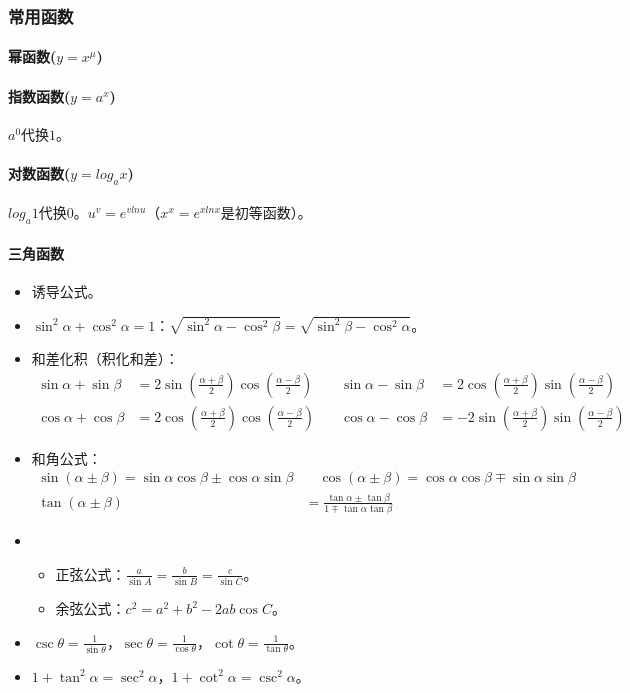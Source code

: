 \documentclass[
12pt, %
a4paper, 
oneside, %
headinclude,footinclude, %
]{scrartcl}
\begin{document}
\subsubsection[常用函数]{常用函数}
\paragraph{幂函数($ y = x^\mu $)}
\paragraph{指数函数($ y =a ^x $)}
$ a^0 $代换$ 1 $。
\paragraph{对数函数($ y = log_a x $)}
$ log_a 1 $代换$ 0 $。$ u^v = e^{v ln u} $（$ x^x = e^{x ln x} $是初等函数）。
\paragraph{三角函数}
\begin{itemize}
\item 诱导公式。
\item $ \sin^2\alpha + \cos^2\alpha = 1 $：$ \sqrt{\sin^2\alpha - \cos^2\beta} = \sqrt{\sin^2\beta - \cos^2\alpha} $。
\item 和差化积（积化和差）：
\begin{align*}
\sin\alpha + \sin\beta &= 2 \sin(\frac{\alpha + \beta}{2}) \cos(\frac{\alpha - \beta}{2}) \quad &
\sin\alpha - \sin\beta &= 2 \cos(\frac{\alpha + \beta}{2}) \sin(\frac{\alpha - \beta}{2}) \\
\cos\alpha + \cos\beta &= 2 \cos(\frac{\alpha + \beta}{2}) \cos(\frac{\alpha - \beta}{2}) \quad &
\cos\alpha - \cos\beta &= -2 \sin(\frac{\alpha + \beta}{2}) \sin(\frac{\alpha - \beta}{2})
\end{align*}
\item 和角公式：
\begin{align*}
\sin(\alpha \pm \beta) = \sin\alpha \cos\beta \pm \cos\alpha \sin\beta & \quad
\cos(\alpha \pm \beta) = \cos\alpha \cos\beta \mp \sin\alpha \sin\beta \\
\tan(\alpha \pm \beta) &= \frac{\tan\alpha \pm \tan\beta}{1 \mp \tan\alpha \tan\beta}
\end{align*}
\item 
\begin{itemize}
\item 正弦公式：$ \frac{a}{\sin A} = \frac{b}{\sin B} = \frac{c}{\sin C} $。
\item 余弦公式：$ c^2 = a^2 + b^2 - 2ab\cos C $。
\end{itemize}
\item $ \csc\theta = \frac{1}{\sin\theta} $，$ \sec\theta = \frac{1}{\cos\theta} $，$ \cot\theta = \frac{1}{\tan\theta} $。
\item $ 1 + \tan^2\alpha = \sec^2\alpha $，$ 1+\cot^2\alpha = \csc^2\alpha $。
\end{itemize}
\end{document}
